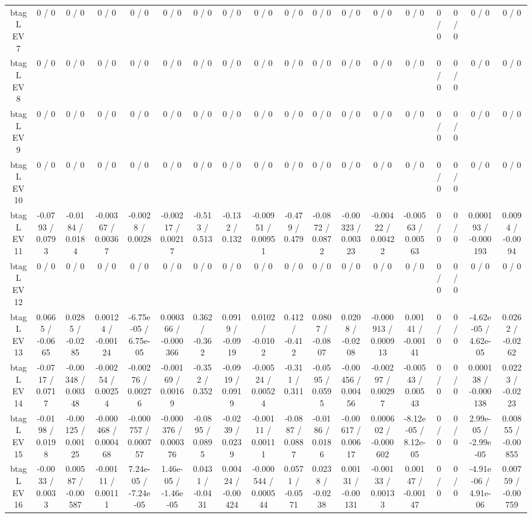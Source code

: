 \documentclass[10pt]{article}
\begin{document}
\begin{table}[htbp]
\begin{center}
\begin{tabular}{|c|c|c|c|c|c|c|c|c|c|c|c|c|c|c|c|c|c|}
  btag L EV 7 & 0 / 0 & 0 / 0 & 0 / 0 & 0 / 0 & 0 / 0 & 0 / 0 & 0 / 0 & 0 / 0 & 0 / 0 & 0 / 0 & 0 / 0 & 0 / 0 & 0 / 0 & 0 / 0 & 0 / 0 & 0 / 0 & 0 / 0 \\ 
  btag L EV 8 & 0 / 0 & 0 / 0 & 0 / 0 & 0 / 0 & 0 / 0 & 0 / 0 & 0 / 0 & 0 / 0 & 0 / 0 & 0 / 0 & 0 / 0 & 0 / 0 & 0 / 0 & 0 / 0 & 0 / 0 & 0 / 0 & 0 / 0 \\ 
  btag L EV 9 & 0 / 0 & 0 / 0 & 0 / 0 & 0 / 0 & 0 / 0 & 0 / 0 & 0 / 0 & 0 / 0 & 0 / 0 & 0 / 0 & 0 / 0 & 0 / 0 & 0 / 0 & 0 / 0 & 0 / 0 & 0 / 0 & 0 / 0 \\ 
  btag L EV 10 & 0 / 0 & 0 / 0 & 0 / 0 & 0 / 0 & 0 / 0 & 0 / 0 & 0 / 0 & 0 / 0 & 0 / 0 & 0 / 0 & 0 / 0 & 0 / 0 & 0 / 0 & 0 / 0 & 0 / 0 & 0 / 0 & 0 / 0 \\ 
  btag L EV 11 & -0.0793 / 0.0793 & -0.0184 / 0.0184 & -0.00367 / 0.00367 & -0.0028 / 0.0028 & -0.00217 / 0.00217 & -0.513 / 0.513 & -0.132 / 0.132 & -0.00951 / 0.00951 & -0.479 / 0.479 & -0.0872 / 0.0872 & -0.00323 / 0.00323 & -0.00422 / 0.00422 & -0.00563 / 0.00563 & 0 / 0 & 0 / 0 & 0.000193 / -0.000193 & 0.0094 / -0.0094 \\ 
  btag L EV 12 & 0 / 0 & 0 / 0 & 0 / 0 & 0 / 0 & 0 / 0 & 0 / 0 & 0 / 0 & 0 / 0 & 0 / 0 & 0 / 0 & 0 / 0 & 0 / 0 & 0 / 0 & 0 / 0 & 0 / 0 & 0 / 0 & 0 / 0 \\ 
  btag L EV 13 & 0.0665 / -0.0665 & 0.0285 / -0.0285 & 0.00124 / -0.00124 & -6.75e-05 / 6.75e-05 & 0.000366 / -0.000366 & 0.362 / -0.362 & 0.0919 / -0.0919 & 0.0102 / -0.0102 & 0.412 / -0.412 & 0.0807 / -0.0807 & 0.0208 / -0.0208 & -0.000913 / 0.000913 & 0.00141 / -0.00141 & 0 / 0 & 0 / 0 & -4.62e-05 / 4.62e-05 & 0.0262 / -0.0262 \\ 
  btag L EV 14 & -0.0717 / 0.0717 & -0.00348 / 0.00348 & -0.00254 / 0.00254 & -0.00276 / 0.00276 & -0.00169 / 0.00169 & -0.352 / 0.352 & -0.0919 / 0.0919 & -0.00524 / 0.00524 & -0.311 / 0.311 & -0.0595 / 0.0595 & -0.00456 / 0.00456 & -0.00297 / 0.00297 & -0.00543 / 0.00543 & 0 / 0 & 0 / 0 & 0.000138 / -0.000138 & 0.0223 / -0.0223 \\ 
  btag L EV 15 & -0.0198 / 0.0198 & -0.00125 / 0.00125 & -0.000468 / 0.000468 & -0.000757 / 0.000757 & -0.000376 / 0.000376 & -0.0895 / 0.0895 & -0.0239 / 0.0239 & -0.00111 / 0.00111 & -0.0887 / 0.0887 & -0.0186 / 0.0186 & -0.00617 / 0.00617 & 0.000602 / -0.000602 & -8.12e-05 / 8.12e-05 & 0 / 0 & 0 / 0 & 2.99e-05 / -2.99e-05 & 0.00855 / -0.00855 \\ 
  btag L EV 16 & -0.0033 / 0.0033 & 0.00587 / -0.00587 & -0.00111 / 0.00111 & 7.24e-05 / -7.24e-05 & 1.46e-05 / -1.46e-05 & 0.0431 / -0.0431 & 0.00424 / -0.00424 & -0.000544 / 0.000544 & 0.0571 / -0.0571 & 0.0238 / -0.0238 & 0.00131 / -0.00131 & -0.00133 / 0.00133 & 0.00147 / -0.00147 & 0 / 0 & 0 / 0 & -4.91e-06 / 4.91e-06 & 0.00759 / -0.00759 \\ 

\end{tabular}
\end{center}
\end{table}
\end{document}
